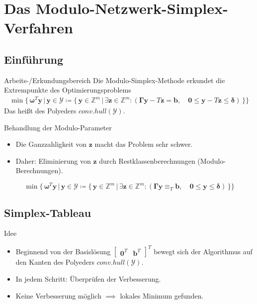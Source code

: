 \documentclass[accentcolor = tud11b, colorbacktitle, landscape, german, presentation, tudmathserif]{tudbeamer}
\newcommand{\Z}{\ensuremath{\mathbb{Z}}}
\newcommand{\mat}[1]{\boldsymbol{\mathbf{#1}}}
\renewcommand{\vec}[1]{\boldsymbol{\mathbf{#1}}}
\begin{document}
	
	\section{Das Modulo-Netzwerk-Simplex-Verfahren}
		\subsection{Einführung}
			\begin{frame}{Arbeits-/Erkundungsbereich}
				Die Modulo-Simplex-Methode erkundet die Extrempunkte des Optimierungsproblems
				\begin{gather*}
					\min \Big\{\, \vec{\omega}^T \vec{y} \,\big\vert\, \vec{y} \in \mathcal{Y}\coloneqq \big\{\, \vec{y} \in \Z^m \,\vert\, \exists \vec{z} \in \Z^m : ( \mat{\Gamma} \vec{y} - T\vec{z} = \vec{b}, \quad \vec{0} \leq \vec{y} - T\vec{z} \leq \vec{\delta} ) \,\big\} \Big\}
				\end{gather*}
				Das heißt des Polyeders \( \mathit{conv.hull}(\mathcal{Y}) \).
			\end{frame}
		
			\begin{frame}{Behandlung der Modulo-Parameter}
				\begin{itemize}
					\item Die Ganzzahligkeit von \(\vec{z}\) macht das Problem sehr schwer.
					\item Daher: Eliminierung von \(\vec{z}\) durch Restklassenberechnungen (Modulo-Berechnungen).
				\end{itemize}
			
				\vspace{0.5cm}
				\begin{equation*}
					\min \Big\{\, \vec{\omega}^T \vec{y} \,\big\vert\, \vec{y} \in \mathcal{Y}\coloneqq \big\{\, \vec{y} \in \Z^m \,\vert\, \exists \vec{z} \in \Z^m : ( \mat{\Gamma} \vec{y} \equiv_T \vec{b}, \quad \vec{0} \leq \vec{y} \leq \vec{\delta} ) \,\big\} \Big\}
				\end{equation*}
			\end{frame}
	
		\subsection{Simplex-Tableau}
			\begin{frame}{Idee}
				\begin{itemize}
					\item Beginnend von der Basislösung \( \begin{bmatrix} \vec{0}^T & \vec{b}^T \end{bmatrix}^T \) bewegt sich der Algorithmus auf den Kanten des Polyeders \( \mathit{conv.hull}(\mathcal{Y}) \).
					\item In jedem Schritt: Überprüfen der Verbesserung.
					\item Keine Verbesserung möglich \( \implies \) lokales Minimum gefunden.
				\end{itemize}
			\end{frame}
		
\end{document}
